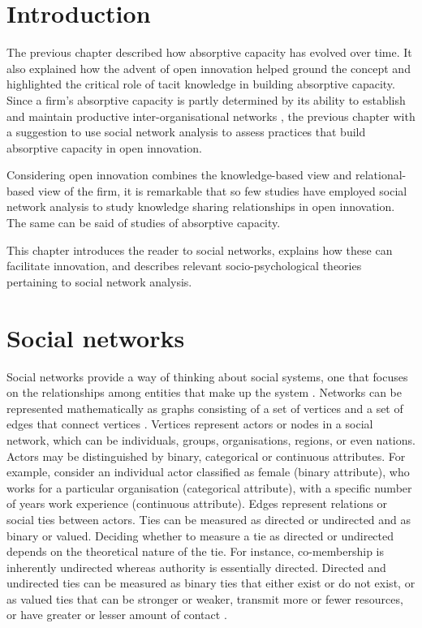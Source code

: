 
\section{Introduction}

The previous chapter described how absorptive capacity has evolved over time. It also explained how the advent of open innovation helped ground the concept and highlighted the critical role of tacit knowledge in building absorptive capacity. Since a firm's absorptive capacity is partly determined by its ability to establish and maintain productive inter-organisational networks \citep{inkpen2005social}, the previous chapter with a suggestion to use social network analysis to assess practices that build absorptive capacity in open innovation. \medskip

Considering open innovation combines the knowledge-based view and relational-based view of the firm, it is remarkable that so few studies have employed social network analysis to study knowledge sharing relationships in open innovation. The same can be said of studies of absorptive capacity. \medskip


This chapter introduces the reader to social networks, explains how these can facilitate innovation, and describes relevant socio-psychological theories pertaining to social network analysis. \medskip

\section{Social networks}

Social networks provide a way of thinking about social systems, one that focuses on the relationships among entities that make up the system \citep{borgatti2013analyzing,robins2015doing}. Networks can be represented mathematically as graphs consisting of a set of vertices and a set of edges that connect vertices \citep{newman2010networks}. Vertices represent actors or nodes in a social network, which can be individuals, groups, organisations, regions, or even nations. Actors may be distinguished by binary, categorical or continuous attributes. For example, consider an individual actor classified as female (binary attribute), who works for a particular organisation (categorical attribute), with a specific number of years work experience (continuous attribute). Edges represent relations or social ties between actors. Ties can be measured as directed or undirected and as binary or valued. Deciding whether to measure a tie as directed or undirected depends on the theoretical nature of the tie. For instance, co-membership is inherently undirected whereas authority is essentially directed. Directed and undirected ties can be measured as binary ties that either exist or do not exist, or as valued ties that can be stronger or weaker, transmit more or fewer resources, or have greater or lesser amount of contact \citep{scott2011sage}.\medskip

